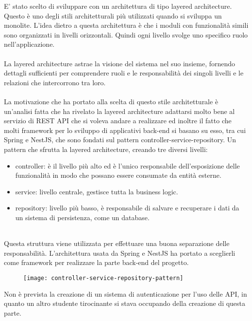 E' stato scelto di sviluppare con un architettura di tipo layered architecture. Questo è uno
degli stili architetturali più utilizzati quando si sviluppa un monolite. L'idea dietro a 
questa architettura è che i moduli con funzionalità simili sono organizzati in livelli
orizzontali. Quindi ogni livello svolge uno specifico ruolo nell'applicazione.
\\\\
La layered architecture astrae la visione del sistema nel suo insieme, fornendo dettagli 
sufficienti per comprendere ruoli e le responsabilità dei singoli livelli e le relazioni
che intercorrono tra loro.
\\\\
La motivazione che ha portato alla scelta di questo stile architetturale è un'analisi fatta
che ha rivelato la layered architecture adattarsi molto bene al servizio di REST API che
si voleva andare a realizzare ed inoltre il fatto
che molti framework per lo sviluppo di applicativi back-end si basano su esso, tra cui
Spring e NestJS, che sono fondati sul pattern controller-service-repository. Un pattern
che sfrutta la layered architecture, creando tre diversi livelli: 
\begin{itemize}
    \item controller: è il livello più alto ed è l'unico responsabile dell'esposizione delle
        funzionalità in modo che possano essere consumate da entità esterne.
    \item service: livello centrale, gestisce tutta la business logic.
    \item repository: livello più basso, è responsabile di salvare e recuperare i dati da un
        sistema di persistenza, come un database.
\end{itemize}
\leavevmode\newline
\\
Questa struttura viene utilizzata per effettuare una buona separazione delle responsabilità.
L'architettura usata da Spring e NestJS ha portato a sceglierli come framework per realizzare
la parte back-end del progetto.
\leavevmode\newline
\begin{figure}[!h]
    \centering
    \texttt{[image: controller-service-repository-pattern]}
\end{figure}

Non è prevista la creazione di un sistema di autenticazione per l'uso delle API, in quanto 
un altro studente tirocinante si stava occupando della creazione di questa parte.

